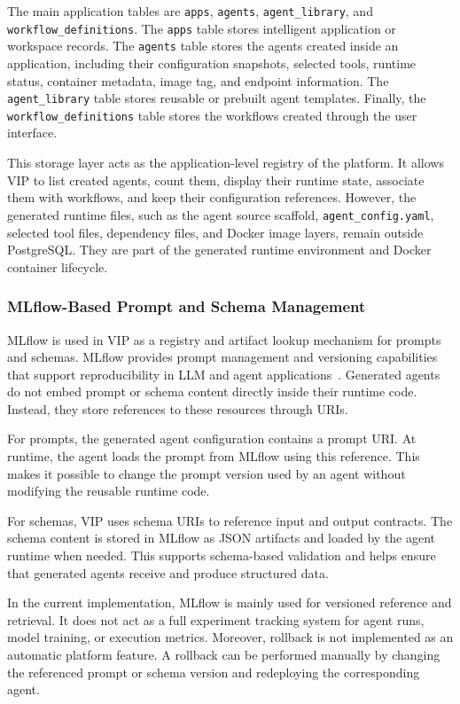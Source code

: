 The main application tables are \texttt{apps}, \texttt{agents}, \texttt{agent\_library}, and \texttt{workflow\_definitions}. The \texttt{apps} table stores intelligent application or workspace records. The \texttt{agents} table stores the agents created inside an application, including their configuration snapshots, selected tools, runtime status, container metadata, image tag, and endpoint information. The \texttt{agent\_library} table stores reusable or prebuilt agent templates. Finally, the \texttt{workflow\_definitions} table stores the workflows created through the user interface.

This storage layer acts as the application-level registry of the platform. It allows VIP to list created agents, count them, display their runtime state, associate them with workflows, and keep their configuration references. However, the generated runtime files, such as the agent source scaffold, \texttt{agent\_config.yaml}, selected tool files, dependency files, and Docker image layers, remain outside PostgreSQL. They are part of the generated runtime environment and Docker container lifecycle.

\subsubsection{MLflow-Based Prompt and Schema Management}


MLflow is used in VIP as a registry and artifact lookup mechanism for prompts and schemas. MLflow provides prompt management and versioning capabilities that support reproducibility in LLM and agent applications~\cite{mlflow_prompt_registry}. Generated agents do not embed prompt or schema content directly inside their runtime code. Instead, they store references to these resources through URIs.

For prompts, the generated agent configuration contains a prompt URI. At runtime, the agent loads the prompt from MLflow using this reference. This makes it possible to change the prompt version used by an agent without modifying the reusable runtime code.

For schemas, VIP uses schema URIs to reference input and output contracts. The schema content is stored in MLflow as JSON artifacts and loaded by the agent runtime when needed. This supports schema-based validation and helps ensure that generated agents receive and produce structured data.

In the current implementation, MLflow is mainly used for versioned reference and retrieval. It does not act as a full experiment tracking system for agent runs, model training, or execution metrics. Moreover, rollback is not implemented as an automatic platform feature. A rollback can be performed manually by changing the referenced prompt or schema version and redeploying the corresponding agent.

